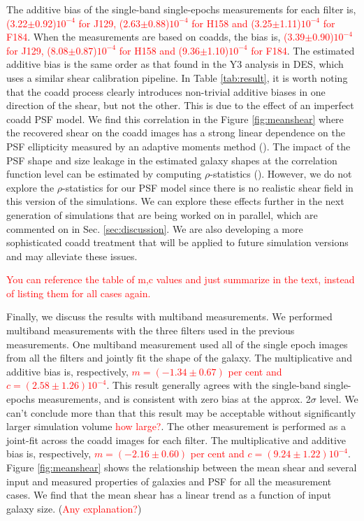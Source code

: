 \documentclass[fleqn,usenatbib]{mnras}
\begin{document}
The additive bias of the single-band single-epochs measurements for each filter is, \textcolor{red}{(3.22$\pm$0.92)$10^{-4}$ for J129, (2.63$\pm$0.88)$10^{-4}$ for H158 and (3.25$\pm$1.11)$10^{-4}$ for F184}. When the measurements are based on coadds, the bias is, \textcolor{red}{(3.39$\pm$0.90)$10^{-4}$ for J129, (8.08$\pm$0.87)$10^{-4}$ for H158 and (9.36$\pm$1.10)$10^{-4}$ for F184}. The estimated additive bias is the same order as that found in the Y3 analysis in DES, which uses a similar shear calibration pipeline. In Table \ref{tab:result}, it is worth noting that the coadd process clearly introduces non-trivial additive biases in one direction of the shear, but not the other. This is due to the effect of an imperfect coadd PSF model. We find this correlation in the Figure \ref{fig:meanshear} where the recovered shear on the coadd images has a strong linear dependence on the PSF ellipticity measured by an adaptive moments method (\citealt{2003MNRAS.343..459H}). The impact of the PSF shape and size leakage in the estimated galaxy shapes at the correlation function level can be estimated by computing $\rho$-statistics (\citealt{2008A&A...484...67P, 2010MNRAS.404..350R, 2016MNRAS.460.2245J}). However, we do not explore the $\rho$-statistics for our PSF model since there is no realistic shear field in this version of the simulations. We can explore these effects further in the next generation of simulations that are being worked on in parallel, which are commented on in Sec. \ref{sec:discussion}. We are also developing a more sophisticated coadd treatment that will be applied to future simulation versions and may alleviate these issues.

\textcolor{red}{You can reference the table of m,c values and just summarize in the text, instead of listing them for all cases again.}

Finally, we discuss the results with multiband measurements. We performed multiband measurements with the three filters used in the previous measurements. One multiband measurement used all of the single epoch images from all the filters and jointly fit the shape of the galaxy. The multiplicative and additive bias is, respectively, \textcolor{red}{$m=(-1.34\pm0.67)$ per cent and $c=(2.58\pm1.26)10^{-4}$}. This result generally agrees with the single-band single-epochs measurements, and is consistent with zero bias at the approx. 2$\sigma$ level. We can't conclude more than that this result may be acceptable without significantly larger simulation volume \textcolor{red}{how large?}. The other measurement is performed as a joint-fit across the coadd images for each filter. The multiplicative and additive bias is, respectively, \textcolor{red}{$m=(-2.16\pm0.60)$ per cent and $c=(9.24\pm1.22)10^{-4}$}. Figure \ref{fig:meanshear} shows the relationship between the mean shear and several input and measured properties of galaxies and PSF for all the measurement cases. We find that the mean shear has a linear trend as a function of input galaxy size. (\textcolor{red}{Any explanation?})
\end{document}
